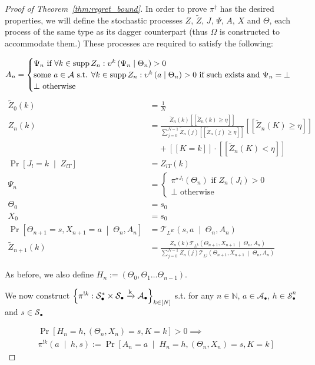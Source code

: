 \documentclass[anon,12pt]{colt2018} %
\DeclareMathOperator{\Supp}{supp}
\newcommand{\AP}[1]{\left(#1\right)}
\newcommand{\AC}[1]{\left\{#1\right\}}
\newcommand{\APM}[2]{\left(#1\;\middle\vert\;#2\right)}
\newcommand{\ABM}[2]{\left[#1\;\middle\vert\;#2\right]}
\newcommand{\CP}[3]{\underset{#1}{\operatorname{Pr}}\ABM{#2}{#3}}
\newcommand{\Nats}{\mathbb{N}}
\newcommand{\K}{\xrightarrow{\textnormal{k}}}
\newcommand{\A}{\mathcal{A}}
\newcommand{\St}{\mathcal{S}}
\newcommand{\T}{\mathcal{T}}
\newcommand{\Ad}{\upsilon}
\newcommand{\X}{\bullet}
\newcommand{\PoS}{:\St_\X^* \times \St_\X \K \A_\X}
\newcommand{\IP}{\pi^{!k}}
\begin{document}
\begin{proof}[Proof of Theorem~\ref{thm:regret_bound}]
In order to prove $\pi^\dagger$ has the desired properties, we will define the stochastic processes $Z$, $\tilde{Z}$, $J$, $\Psi$, $A$, $X$ and $\Theta$, each process of the same type as its dagger counterpart (thus $\Omega$ is constructed to accommodate them.) These processes are required to satisfy the following:

\[A_n = \begin{cases} \Psi_n \text{ if } \forall k \in \Supp{Z_n}: \Ad^k\APM{\Psi_n}{\Theta_n} > 0\\ \text{some } a\in\A \text{ s.t. } \forall k \in \Supp{Z_n}: \Ad^k\APM{a}{\Theta_n} > 0 \text{ if such exists and } \Psi_n=\bot\\\bot \text{ otherwise} \end{cases}\\\]
%
\begin{align*}
\tilde{Z}_0(k)&=\frac{1}{N} \\ 
Z_{n}(k) &= \frac{\tilde{Z}_{n}(k)[[\tilde{Z}_{n}(k) \geq \eta]] }{\sum_{j = 0}^{N-1}\tilde{Z}_{n}(j)[[\tilde{Z}_{n}(j) \geq \eta]]}[[\tilde{Z}_{n}(K) \geq \eta]] \\&\ \ \ \ \ + [[K = k]]\cdot [[\tilde{Z}_{n}(K) < \eta]]\\
\CP{}{J_{l} = k}{Z_{lT}} &= Z_{lT}\left(k\right)\\
\Psi_{n} &= \begin{cases} \pi^{\star J_l}\AP{\Theta_n} \text{ if } Z_n\AP{J_l} > 0 \\ \bot \text{ otherwise} \end{cases}\\
\Theta_0 &= s_0\\
X_0 &= s_0\\
\CP{}{\Theta_{n+1} = s,X_{n+1}=a}{\Theta_{n},A_n} &= \T_{L^K}\APM{s,a}{\Theta_n,A_n}\\
\tilde{Z}_{n+1}(k)&=\frac{Z_{n}(k) \T_{L^k}\APM{\Theta_{n+1},X_{n+1}}{\Theta_n,A_n}}{\sum_{j = 0}^{N-1} Z_n(j) \T_{L^j}\APM{\Theta_{n+1},X_{n+1}}{\Theta_n,A_n}}
\end{align*}

As before, we also define $H_n:=\AP{\Theta_0,\Theta_1\dots\Theta_{n-1}}$.

We now construct $\AC{\IP\PoS}_{k\in[N]}$ s.t. for any $n \in \Nats$, $a \in \A_\X$, $h \in \St_\X^n$ and $s\in\St_\X$

\begin{align*}
&\Pr\left[H_n=h,\AP{\Theta_n,X_n}=s,K=k\right] > 0 \implies\\
&\pi^{!k}\APM{a}{h,s}:=\CP{}{A_n=a}{H_n=h,\AP{\Theta_n,X_n}=s,K=k}
\end{align*}


\end{proof}
\end{document}
